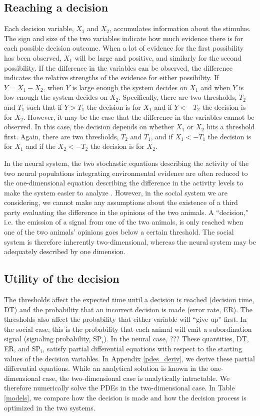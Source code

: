 \documentclass{article}
\begin{document}
\subsection{Reaching a decision }
Each decision variable, $X_1$ and $X_2$, accumulates information about the stimulus.  The sign and size of the two variables indicate how much evidence there is for each possible decision outcome.  When a lot of evidence for the first possibility has been observed, $X_1$ will be large and positive, and similarly for the second possibility.  If the difference in the variables can be observed, the difference indicates the relative strengths of the evidence for either possibility. If $Y=X_1-X_2$, when $Y$ is large enough the system decides on $X_1$ and when $Y$ is low enough the system decides on $X_2$.  Specifically, there are two thresholds, $T_2$ and $T_1$ such that if $Y>T_1$ the decision is for $X_1$ and if $Y<-T_2$ the decision is for $X_2$.  However, it may be the case that the difference in the variables cannot be observed.  In this case, the decision depends on whether $X_1$ or $X_2$ hits a threshold first.  Again, there are two thresholds, $T_2$ and $T_1$, and if $X_1<-T_1$ the decision is for $X_1$ and if the $X_2<-T_2$ the decision is for $X_2$. 

In the neural system, the two stochastic equations describing the activity of the two neural populations integrating environmental evidence are often reduced to the one-dimensional equation describing the difference in the activity levels to make the system easier to analyze \cite{Brown:2005fk,Bogacz:2006uq,Feng:2009kl}.  However, in the social system we are considering, we cannot make any assumptions about the existence of a third party evaluating the difference in the opinions of the two animals.  A ``decision," i.e. the emission of a signal from one of the two animals, is only reached when one of the two animals' opinions goes below a certain threshold.  The social system is therefore inherently two-dimensional, whereas the neural system may be adequately described by one dimension.   

\subsection{Utility of the decision }
The thresholds affect the expected time until a decision is reached (decision time, DT) and the probability that an incorrect decision is made (error rate, ER).  The thresholds also affect the probability that either variable will ``give up'' first.  In the social case, this is the probability that each animal will emit a subordination signal (signaling probability, $\text{SP}_i$).  In the neural case, ??? These quantities, DT, ER, and $\text{SP}_i$, satisfy partial differential equations with respect to the starting values of the decision variables. In Appendix \ref{pdes_deriv}, we derive these partial differential equations.  While an analytical solution is known in the one-dimensional case, the two-dimensional case is analytically intractable.  We therefore numerically solve the PDEs in the two-dimensional case.  In Table \ref{models}, we compare how the decision is made and how the decision process is optimized in the two systems.
\end{document}
